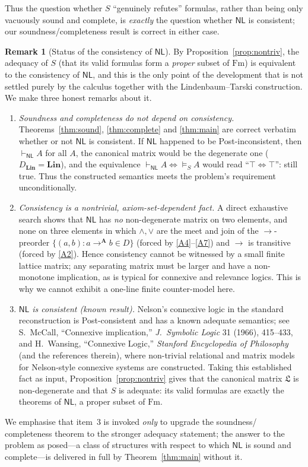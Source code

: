 \documentclass[12pt]{article}
\theoremstyle{definition}
\newtheorem{remark}{Remark}
\newcommand{\NL}{\mathsf{NL}}
\newcommand{\prv}{\vdash_{\NL}}
\newcommand{\vld}{\vDash}
\newcommand{\Fm}{\mathrm{Fm}}
\newcommand{\imp}{\rightarrow}
\newcommand{\A}{\mathbf{A}}
\newcommand{\Lin}{\mathbf{Lin}}
\begin{document}
Thus the question whether $S$ ``genuinely refutes'' formulas, rather than being
only vacuously sound and complete, is \emph{exactly} the question whether $\NL$
is consistent; our soundness/completeness result is correct in either case.

\begin{remark}[Status of the consistency of $\NL$]\label{rem:consistency-status}
By Proposition~\ref{prop:nontriv}, the adequacy of $S$ (that its valid formulas
form a \emph{proper} subset of $\Fm$) is equivalent to the consistency of $\NL$,
and this is the only point of the development that is not settled purely by the
calculus together with the Lindenbaum--Tarski construction. We make three honest
remarks about it.

\begin{enumerate}
\item \emph{Soundness and completeness do not depend on consistency.}
Theorems~\ref{thm:sound}, \ref{thm:complete} and \ref{thm:main} are correct
verbatim whether or not $\NL$ is consistent. If $\NL$ happened to be
Post-inconsistent, then $\prv A$ for all $A$, the canonical matrix would be the
degenerate one ($D_{\Lin}=\Lin$), and the equivalence $\prv A\iff\vld_S A$ would
read ``$\top\iff\top$'': still true. Thus the constructed semantics meets the
problem's requirement unconditionally.

\item \emph{Consistency is a nontrivial, axiom-set-dependent fact.} A direct
exhaustive search shows that $\NL$ has \emph{no} non-degenerate matrix on two
elements, and none on three elements in which $\wedge,\vee$ are the meet and join
of the $\imp$-preorder $\{(a,b):a\imp^{\A}b\in D\}$ (forced by
\eqref{A4}--\eqref{A7}) and $\imp$ is transitive (forced by \eqref{A2}). Hence
consistency cannot be witnessed by a small finite lattice matrix; any separating
matrix must be larger and have a non-monotone implication, as is typical for
connexive and relevance logics. This is why we cannot exhibit a one-line finite
counter-model here.

\item \emph{$\NL$ is consistent (known result).} Nelson's connexive logic in the
standard reconstruction is Post-consistent and has a known adequate semantics;
see S.~McCall, ``Connexive implication,'' \emph{J.\ Symbolic Logic} 31 (1966),
415--433, and H.~Wansing, ``Connexive Logic,'' \emph{Stanford Encyclopedia of
Philosophy} (and the references therein), where non-trivial relational and
matrix models for Nelson-style connexive systems are constructed. Taking this
established fact as input, Proposition~\ref{prop:nontriv} gives that the
canonical matrix $\mathfrak L$ is non-degenerate and that $S$ is adequate: its
valid formulas are exactly the theorems of $\NL$, a proper subset of $\Fm$.
\end{enumerate}

We emphasise that item~3 is invoked \emph{only} to upgrade the soundness/
completeness theorem to the stronger adequacy statement; the answer to the
problem as posed---a class of structures with respect to which $\NL$ is sound and
complete---is delivered in full by Theorem~\ref{thm:main} without it.
\end{remark}
\end{document}
